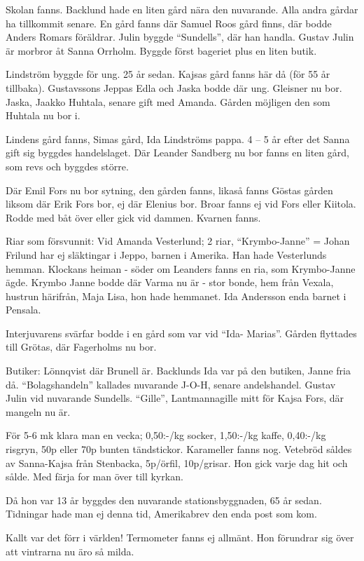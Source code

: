 Skolan fanns. Backlund hade en liten gård nära den nuvarande. Alla andra gårdar ha tillkommit senare. En gård fanns där Samuel Roos gård finns, där bodde Anders Romars föräldrar. Julin byggde ``Sundells'', där han handla. Gustav Julin är morbror åt Sanna Orrholm. Byggde först bageriet plus en liten butik.

Lindström byggde för ung. 25 år sedan. Kajsas gård fanns här då (för 55 år tillbaka). Gustavssons Jeppas Edla och Jaska bodde där ung. Gleisner nu bor. Jaska, Jaakko Huhtala, senare gift med Amanda. Gården möjligen den som Huhtala nu bor i.

Lindens gård fanns, Simas gård, Ida Lindströms pappa. 4 – 5 år efter det Sanna gift sig byggdes handelslaget. Där Leander Sandberg nu bor fanns en liten gård, som revs och byggdes större.

Där Emil Fors nu bor sytning, den gården fanns, likaså fanns Göstas gården liksom där Erik Fors bor, ej där Elenius bor.
Broar fanns ej vid Fors eller Kiitola. Rodde med båt över eller gick vid dammen. Kvarnen fanns.

Riar som försvunnit: Vid Amanda Vesterlund; 2 riar,  ``Krymbo-Janne'' = Johan Frilund har ej släktingar i Jeppo, barnen i Amerika. Han hade Vesterlunds hemman. Klockans heiman - söder om Leanders fanns en ria, som Krymbo-Janne ägde. Krymbo Janne bodde där Varma nu är - stor bonde, hem från Vexala, hustrun härifrån, Maja Lisa, hon hade hemmanet. Ida Andersson enda barnet i Pensala.

Interjuvarens svärfar bodde i en gård som var vid ``Ida- Marias''. Gården flyttades till Grötas, där Fagerholms nu bor.

Butiker: Lönnqvist där Brunell är. Backlunds Ida var på den butiken, Janne fria då. ``Bolagshandeln'' kallades nuvarande J-O-H, senare andelshandel. Gustav Julin vid nuvarande Sundells.  ``Gille'', Lantmannagille mitt för Kajsa Fors, där mangeln nu är.

För 5-6 mk klara man en vecka; 0,50:-/kg socker, 1,50:-/kg kaffe, 0,40:-/kg risgryn, 50p eller 70p bunten tändstickor. Karameller fanns nog. Vetebröd såldes av Sanna-Kajsa från Stenbacka, 5p/örfil, 10p/grisar. Hon gick varje dag hit och sålde. Med färja for man över till kyrkan.

Då hon var 13 år byggdes den nuvarande stationsbyggnaden, 65 år sedan. Tidningar hade man ej denna tid, Amerikabrev den enda post som kom.

Kallt var det förr i världen! Termometer fanns ej allmänt. Hon förundrar sig över att vintrarna nu äro så milda.

